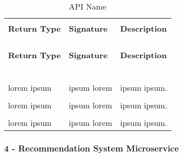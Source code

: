 \begin{longtable}{p{}p{}p{}}
    \caption{API Name}
    \vspace{0.5em}\\
    \hline
    \vspace{0.5em}\\
    \textbf{Return Type} & \textbf{Signature} & \textbf{Description} \\
    \vspace{0.5em}\\
    \hline
    \vspace{0.5em}\\
    \endfirsthead
    \vspace{0.5em}\\
    \hline
    \vspace{0.5em}\\
    \textbf{Return Type} & \textbf{Signature} & \textbf{Description} \\
    \vspace{0.5em}\\
    \hline
    \vspace{0.5em}\\
    \endhead
    
    \vspace{0.5em}\\
    \hline
    \vspace{0.5em}\\
    \endfoot
    
    \vspace{0.5em}\\
    \hline
    \vspace{0.5em}\\
    \endlastfoot
    
    lorem ipsum &
    ipsum lorem &
    ipsum ipsum. \\
    \vspace{0.5em}\\
    lorem ipsum &
    ipsum lorem &
    ipsum ipsum. \\
    \vspace{0.5em}\\
    lorem ipsum &
    ipsum lorem &
    ipsum ipsum. \\

\end{longtable}

\subsubsection{4 - Recommendation System Microservice}

